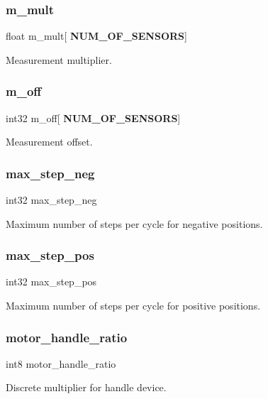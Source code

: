 \subsubsection{m\+\_\+mult}
{\footnotesize\ttfamily float m\+\_\+mult[\textbf{ N\+U\+M\+\_\+\+O\+F\+\_\+\+S\+E\+N\+S\+O\+RS}]}

Measurement multiplier. \mbox{\label{structst__mem_ab544f035124be893918bafb611fe88d9}} 
\subsubsection{m\+\_\+off}
{\footnotesize\ttfamily int32 m\+\_\+off[\textbf{ N\+U\+M\+\_\+\+O\+F\+\_\+\+S\+E\+N\+S\+O\+RS}]}

Measurement offset. \mbox{\label{structst__mem_a14fe3ed96d232dced2d33efc493a0667}} 
\subsubsection{max\+\_\+step\+\_\+neg}
{\footnotesize\ttfamily int32 max\+\_\+step\+\_\+neg}

Maximum number of steps per cycle for negative positions. \mbox{\label{structst__mem_a9be5987152b8c6bb28c1d311bc94e5e3}} 
\subsubsection{max\+\_\+step\+\_\+pos}
{\footnotesize\ttfamily int32 max\+\_\+step\+\_\+pos}

Maximum number of steps per cycle for positive positions. \mbox{\label{structst__mem_a098badbb74d31ea6257e57f6d66823cc}} 
\subsubsection{motor\+\_\+handle\+\_\+ratio}
{\footnotesize\ttfamily int8 motor\+\_\+handle\+\_\+ratio}

Discrete multiplier for handle device. \mbox{\label{structst__mem_aa2ceebf7546e978c8b0393ce8035532d}} 
